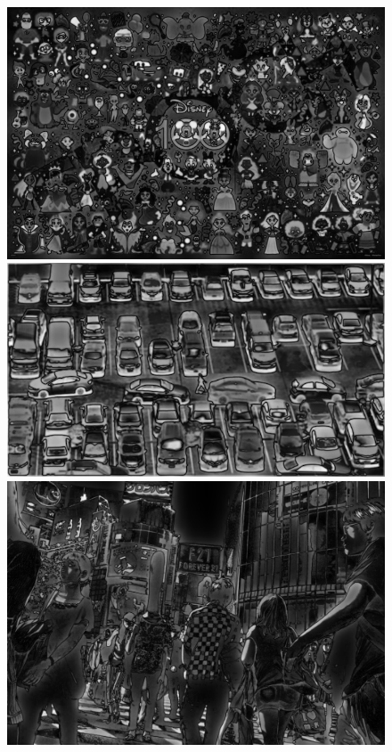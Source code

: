 \begin{figure}[H]
	\centering
	\begin{minipage}[hb]{0.3\textwidth}
		\centering
		\includegraphics[width=\textwidth]{Graphics/disney-saliency.jpg}
	\end{minipage}
	\hfill
	\begin{minipage}[hb]{0.3\textwidth}
		\centering
		\includegraphics[width=\textwidth]{Graphics/cars-saliency.jpg}
	\end{minipage}
	\hfill
	\begin{minipage}[hb]{0.3\textwidth}
		\centering
		\includegraphics[width=\textwidth]{Graphics/japan-saliency.jpg}

\end{minipage}
\end{figure}
